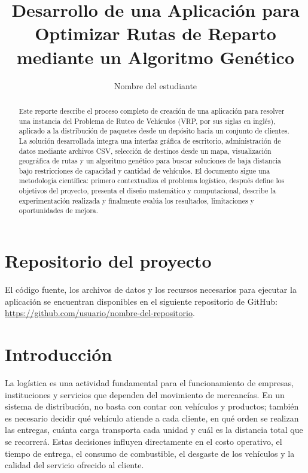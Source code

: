 \documentclass[runningheads]{llncs}
\title{Desarrollo de una Aplicaci\'on para Optimizar Rutas de Reparto mediante un Algoritmo Gen\'etico}
\author{Nombre del estudiante\inst{1}}
\institute{Instituci\'on educativa\\
\email{correo@ejemplo.com}}
\begin{document}
\maketitle              %

\begin{abstract}
Este reporte describe el proceso completo de creaci\'on de una aplicaci\'on para
resolver una instancia del Problema de Ruteo de Veh\'iculos (VRP, por sus siglas
en ingl\'es), aplicado a la distribuci\'on de paquetes desde un dep\'osito hacia un
conjunto de clientes. La soluci\'on desarrollada integra una interfaz gr\'afica de
escritorio, administraci\'on de datos mediante archivos CSV, selecci\'on de
destinos desde un mapa, visualizaci\'on geogr\'afica de rutas y un algoritmo
gen\'etico para buscar soluciones de baja distancia bajo restricciones de
capacidad y cantidad de veh\'iculos. El documento sigue una metodolog\'ia
cient\'ifica: primero contextualiza el problema log\'istico, despu\'es define los
objetivos del proyecto, presenta el dise\~no matem\'atico y computacional,
describe la experimentaci\'on realizada y finalmente eval\'ua los resultados,
limitaciones y oportunidades de mejora.

\end{abstract}

\section*{Repositorio del proyecto}

El c\'odigo fuente, los archivos de datos y los recursos necesarios para ejecutar
la aplicaci\'on se encuentran disponibles en el siguiente repositorio de GitHub:
\url{https://github.com/usuario/nombre-del-repositorio}.

\section{Introducci\'on}

La log\'istica es una actividad fundamental para el funcionamiento de empresas,
instituciones y servicios que dependen del movimiento de mercanc\'ias. En un
sistema de distribuci\'on, no basta con contar con veh\'iculos y productos; tambi\'en
es necesario decidir qu\'e veh\'iculo atiende a cada cliente, en qu\'e orden se
realizan las entregas, cu\'anta carga transporta cada unidad y cu\'al es la
distancia total que se recorrer\'a. Estas decisiones influyen directamente en el
costo operativo, el tiempo de entrega, el consumo de combustible, el desgaste de
los veh\'iculos y la calidad del servicio ofrecido al cliente.
\end{document}
